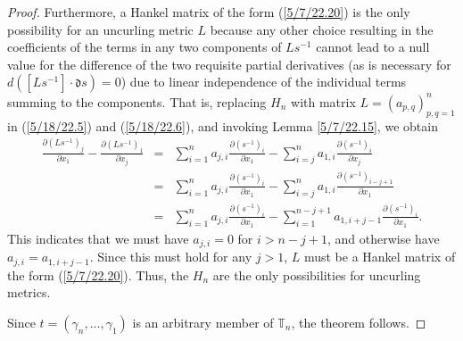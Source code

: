 \documentclass{amsart}
\numberwithin{equation}{section}
\theoremstyle{definition}
\numberwithin{theorem}{section}
\begin{document}
\begin{proof}
Furthermore, a Hankel matrix of the form (\ref{5/7/22.20}) is the only possibility for an uncurling metric $L$ because any other choice resulting in the coefficients of the terms in any two components of $Ls^{-1}$ cannot lead to a null value for the difference of the two requisite partial derivatives (as is necessary for $d\left([L s^{-1}]\cdot \mathfrak{d}s\right) = 0$) due to linear independence of the individual terms summing to the components. That is, replacing  $H_n$ with matrix $L=(a_{p,q})_{p,q=1}^n$ in (\ref{5/18/22.5}) 
and (\ref{5/18/22.6}), and invoking Lemma \ref{5/7/22.15}, we obtain
\begin{eqnarray}\nonumber \frac{\partial \left(L s^{-1}\right)_j}{\partial x_1}  -  \frac{\partial \left(L s^{-1}\right)_1}{\partial x_j} &=&  \sum_{i=1}^n a_{j,i}\frac{\partial \left(s^{-1}\right)_i}{\partial x_1} - \sum_{i=j}^n a_{1,i}\frac{\partial \left(s^{-1}\right)_i}{\partial x_j} \\  &=& \sum_{i=1}^n a_{j,i}\frac{\partial \left(s^{-1}\right)_i}{\partial x_1} - \sum_{i=j}^n a_{1,i}\frac{\partial \left(s^{-1}\right)_{i-j+1}}{\partial x_1} \nonumber \\
&=& \sum_{i=1}^n a_{j,i}\frac{\partial \left(s^{-1}\right)_i}{\partial x_1} - \sum_{i=1}^{n-j+1} a_{1,i+j-1}\frac{\partial \left(s^{-1}\right)_i}{\partial x_1}.
\label{5/9/22.10}
\end{eqnarray}
This indicates that we must have $a_{j,i}=0$ for $i>n-j+1$, and otherwise have $a_{j,i} = a_{1,i+j-1}$.  Since this must hold for any $j>1$, $L$ must be a Hankel matrix of the form (\ref{5/7/22.20}).  Thus, the $H_n$ are the only possibilities for uncurling metrics. 

Since $t=(\gamma_n,\dots,\gamma_1)$ is an arbitrary member of $\mathbb{T}_n$, the theorem follows.
\end{proof}
\end{document}
